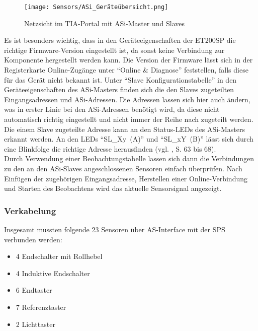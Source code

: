 \begin{figure}[H]
    \centering
    \texttt{[image: Sensors/ASi\_Geräteübersicht.png]}
    \caption{Netzsicht im TIA-Portal mit ASi-Master und Slaves}
    \label{ASi-Netzansicht}
\end{figure}

Es ist besonders wichtig, dass in den Geräteeigenschaften der ET200SP die richtige Firmware-Version eingestellt ist, da sonst keine Verbindung zur Komponente hergestellt werden kann. Die Version der Firmware lässt sich in der Registerkarte Online-Zugänge unter \enquote{Online \& Diagnose} feststellen, falls diese für das Gerät nicht bekannt ist. Unter \enquote{Slave Konfigurationstabelle} in den Geräteeigenschaften des ASi-Masters finden sich die den Slaves zugeteilten Eingangsadressen und ASi-Adressen. Die Adressen lassen sich hier auch ändern, was in erster Linie bei den ASi-Adressen benötigt wird, da diese nicht automatisch richtig eingestellt und nicht immer der Reihe nach zugeteilt werden. Die einem Slave zugeteilte Adresse kann an den Status-LEDs des ASi-Masters erkannt werden. An den LEDs \enquote{\mbox{SL\_Xy (A)}} und \enquote{\mbox{SL\_xY (B)}} lässt sich durch eine Blinkfolge die richtige Adresse herausfinden (vgl. \cite{ASi-Master_Handbuch}, S. 63 bis 68).\\
Durch Verwendung einer Beobachtungstabelle lassen sich dann die Verbindungen zu den an den ASi-Slaves angeschlossenen Sensoren einfach überprüfen. Nach Einfügen der zugehörigen Eingangsadresse, Herstellen einer Online-Verbindung und Starten des Beobachtens wird das aktuelle Sensorsignal angezeigt.

\subsubsection{Verkabelung}
Insgesamt mussten folgende 23 Sensoren über AS-Interface mit der SPS verbunden werden:
\begin{itemize}
    \item 4 Endschalter mit Rollhebel
    \item 4 Induktive Endschalter
    \item 6 Endtaster
    \item 7 Referenztaster
    \item 2 Lichttaster
\end{itemize}

